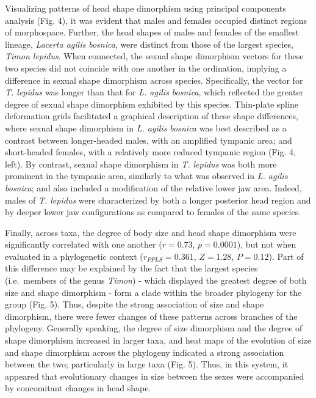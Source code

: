 \documentclass[]{article}
\begin{document}
Visualizing patterns of head shape dimorphism using principal components
analysis (Fig. 4), it was evident that males and females occupied
distinct regions of morphospace. Further, the head shapes of males and
females of the smallest lineage, \emph{Lacerta agilis bosnica}, were
distinct from those of the largest species, \emph{Timon lepidus}. When
connected, the sexual shape dimorphism vectors for these two species did
not coincide with one another in the ordination, implying a difference
in sexual shape dimorphism across species. Specifically, the vector for
\emph{T. lepidus} was longer than that for \emph{L. agilis bosnica},
which reflected the greater degree of sexual shape dimorphism exhibited
by this species. Thin-plate spline deformation grids facilitated a
graphical description of these shape differences, where sexual shape
dimorphism in \emph{L. agilis bosnica} was best described as a contrast
between longer-headed males, with an amplified tympanic area; and
short-headed females, with a relatively more reduced tympanic region
(Fig. 4, left). By contrast, sexual shape dimorphism in \emph{T.
lepidus} was both more prominent in the tympanic area, similarly to what
was observed in \emph{L. agilis bosnica}; and also included a
modification of the relative lower jaw area. Indeed, males of \emph{T.
lepidus} were characterized by both a longer posterior head region and
by deeper lower jaw configurations as compared to females of the same
species. \hfill\break

Finally, across taxa, the degree of body size and head shape dimorphism
were significantly correlated with one another (\(r=0.73\),
\(p=0.0001\)), but not when evaluated in a phylogenetic context
(\(r_{PPLS} = 0.361\), \(Z=1.28\), \(P = 0.12\)). Part of this
difference may be explained by the fact that the largest species
(i.e.~members of the genus \emph{Timon}) - which displayed the greatest
degree of both size and shape dimorphism - form a clade within the
broader phylogeny for the group (Fig. 5). Thus, despite the strong
association of size and shape dimorphism, there were fewer changes of
these patterns across branches of the phylogeny. Generally speaking, the
degree of size dimorphism and the degree of shape dimorphism increased
in larger taxa, and heat maps of the evolution of size and shape
dimorphism across the phylogeny indicated a strong association between
the two; particularly in large taxa (Fig. 5). Thus, in this system, it
appeared that evolutionary changes in size between the sexes were
accompanied by concomitant changes in head shape.
\end{document}
